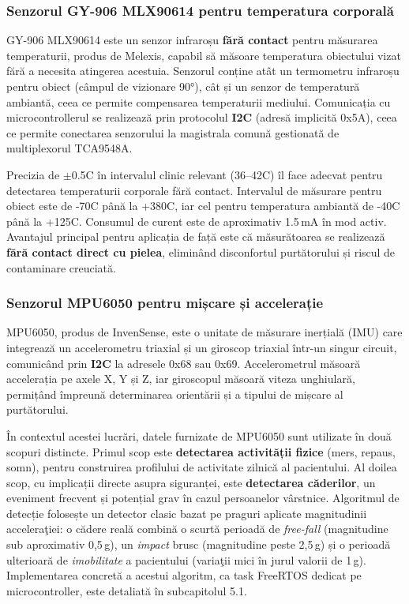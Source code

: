\documentclass[12pt,a4paper,twoside]{article}
\begin{document}
\subsubsection{Senzorul GY-906 MLX90614 pentru temperatura corporală}

GY-906 MLX90614 este un senzor infraroșu \textbf{fără contact} pentru măsurarea temperaturii, produs de Melexis, capabil să măsoare temperatura obiectului vizat fără a necesita atingerea acestuia. Senzorul conține atât un termometru infraroșu pentru obiect (câmpul de vizionare 90°), cât și un senzor de temperatură ambiantă, ceea ce permite compensarea temperaturii mediului. Comunicația cu microcontrollerul se realizează prin protocolul \textbf{I2C} (adresă implicită 0x5A), ceea ce permite conectarea senzorului la magistrala comună gestionată de multiplexorul TCA9548A.

Precizia de $\pm$0.5\textdegree C în intervalul clinic relevant (36--42\textdegree C) îl face adecvat pentru detectarea temperaturii corporale fără contact. Intervalul de măsurare pentru obiect este de -70\textdegree C până la +380\textdegree C, iar cel pentru temperatura ambiantă de -40\textdegree C până la +125\textdegree C. Consumul de curent este de aproximativ 1.5\,mA în mod activ. Avantajul principal pentru aplicația de față este că măsurătoarea se realizează \textbf{fără contact direct cu pielea}, eliminând disconfortul purtătorului și riscul de contaminare creuciată.

\subsubsection{Senzorul MPU6050 pentru mișcare și accelerație}

MPU6050, produs de InvenSense, este o unitate de măsurare inerțială (IMU) care integrează un accelerometru triaxial și un giroscop triaxial într-un singur circuit, comunicând prin \textbf{I2C} la adresele 0x68 sau 0x69. Accelerometrul măsoară accelerația pe axele X, Y și Z, iar giroscopul măsoară viteza unghiulară, permițând împreună determinarea orientării și a tipului de mișcare al purtătorului.

În contextul acestei lucrări, datele furnizate de MPU6050 sunt utilizate în două scopuri distincte. Primul scop este \textbf{detectarea activității fizice} (mers, repaus, somn), pentru construirea profilului de activitate zilnică al pacientului. Al doilea scop, cu implicații directe asupra siguranței, este \textbf{detectarea căderilor}, un eveniment frecvent și potențial grav în cazul persoanelor vârstnice. Algoritmul de detecție folosește un detector clasic bazat pe praguri aplicate magnitudinii acceleraţiei: o cădere reală combină o scurtă perioadă de \textit{free-fall} (magnitudine sub aproximativ 0,5\,g), un \textit{impact} brusc (magnitudine peste 2,5\,g) și o perioadă ulterioară de \textit{imobilitate} a pacientului (variaţii mici în jurul valorii de 1\,g). Implementarea concretă a acestui algoritm, ca task FreeRTOS dedicat pe microcontroller, este detaliată în subcapitolul 5.1.
\end{document}

